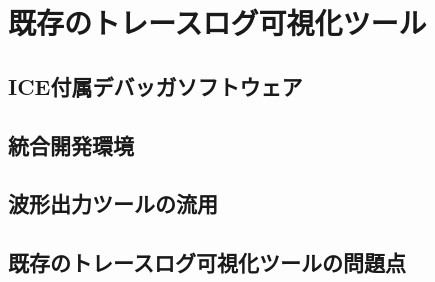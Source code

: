 \chapter{既存のトレースログ可視化ツール}

\section{ICE付属デバッガソフトウェア}

\section{統合開発環境}

\section{波形出力ツールの流用}

\section{既存のトレースログ可視化ツールの問題点}

